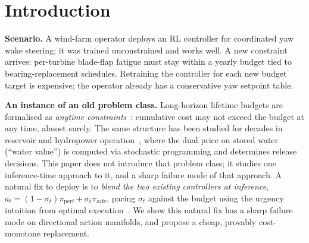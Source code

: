 \documentclass{article}
\begin{document}
\begin{abstract}
We propose two cost-monotone fixes implemented with one extra cost probe per step: \textbf{rejection blending} (engage $\sigma$ only if the probe confirms $\pi_{\mathrm{safe}}$ helps) and \textbf{argmin selection} (binary commitment).
Both are provably no-worse-than-$\pi_{\mathrm{perf}}$.
Empirically they recover the Pareto frontier the linear blend misses: at the zero-crossing hazard regime on multi\_modal, rejection blending gains $+6.8\%$ farm power and $-0.6\%$ DEL versus linear (Table~\ref{tab:fix_recovery_zero}); on Safety Gymnasium at the worst-case rotation, $-97\%$ cost and $55\!\times$ reward (Table~\ref{tab:sg_hazard}).
A cross-layout ablation rules out the obvious objection ``just retrain with a DEL-aware reward'': $\beta\!=\!1$ DEL-aware training gives Pareto-improving behaviour on one layout and a $+5$--$7\%$ DEL trade-off on another, so deployment-time pacing remains required when retraining for every constraint is infeasible.
\end{abstract}

\section{Introduction}
\label{sec:intro}

\textbf{Scenario.}
A wind-farm operator deploys an RL controller for coordinated yaw wake steering; it was trained unconstrained and works well.
A new constraint arrives: per-turbine blade-flap fatigue must stay within a yearly budget tied to bearing-replacement schedules.
Retraining the controller for each new budget target is expensive; the operator already has a conservative yaw setpoint table.

\textbf{An instance of an old problem class.}
Long-horizon lifetime budgets are formalised as \emph{anytime constraints}~\citep{mcmahan2024anytime}: cumulative cost may not exceed the budget at any time, almost surely.
The same structure has been studied for decades in reservoir and hydropower operation~\citep{tilmant2008water, you2008hedging}, where the dual price on stored water (``water value'') is computed via stochastic programming and determines release decisions.
This paper does not introduce that problem class; it studies one inference-time approach to it, and a sharp failure mode of that approach.
A natural fix to deploy is to \emph{blend the two existing controllers at inference}, $a_t = (1-\sigma_t)\pi_{\mathrm{perf}} + \sigma_t\pi_{\mathrm{safe}}$, pacing $\sigma_t$ against the budget using the urgency intuition from optimal execution~\citep{almgren2001optimal}.
We show this natural fix has a sharp failure mode on directional action manifolds, and propose a cheap, provably cost-monotone replacement.
\end{document}
